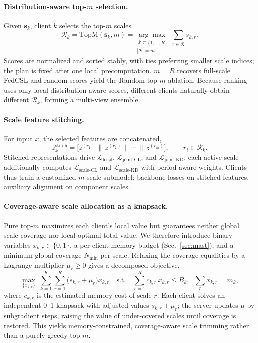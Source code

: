 \documentclass[sigconf]{acmart}
\begin{document}
\paragraph{Distribution-aware top-$m$ selection.}
Given $\mathbf{s}_k$, client $k$ selects the top-$m$ scales
\begin{equation}
\mathcal{R}_k=\mathrm{TopM}(\mathbf{s}_k,m)
=\underset{\substack{\mathcal{R}\subseteq\{1,\dots,R\}\\|\mathcal{R}|=m}}{\arg\max}\;
\sum_{r\in\mathcal{R}} s_{k,r}.
\label{eq:spilter-topm}
\end{equation}
Scores are normalized and sorted stably, with ties preferring smaller scale
indices; the plan is fixed after one local precomputation. $m=R$ recovers
full-scale FedCSL and random scores yield the Random-top-$m$ ablation. Because
ranking uses only local distribution-aware scores, different clients naturally
obtain different $\mathcal{R}_k$, forming a multi-view ensemble.

\paragraph{Scale feature stitching.}
For input $x$, the selected features are concatenated,
\begin{equation}
z^{\mathrm{stitch}}_k = \bigl[z^{(r_1)} \,\|\, z^{(r_2)} \,\|\, \cdots \,\|\, z^{(r_m)}\bigr],
\qquad r_i\in\mathcal{R}_k .
\label{eq:stitch}
\end{equation}
Stitched representations drive $\mathcal{L}_{\text{local}}$,
$\mathcal{L}_{\text{joint-CL}}$, and $\mathcal{L}_{\text{joint-KD}}$; each active
scale additionally computes $\mathcal{L}_{\text{scale-CL}}$ and
$\mathcal{L}_{\text{scale-KD}}$ with period-aware weights. Clients thus train a
customized $m$-scale submodel: backbone losses on stitched features, auxiliary
alignment on component scales.

\paragraph{Coverage-aware scale allocation as a knapsack.}
Pure top-$m$ maximizes each client's local value but guarantees neither global
scale coverage nor local optimal total value. We therefore introduce binary
variables $x_{k,r}\in\{0,1\}$, a per-client memory budget (Sec.~\ref{sec:mast}),
and a minimum global coverage $N_{\min}$ per scale. Relaxing the coverage
equalities by a Lagrange multiplier $\mu_r\ge 0$ gives a decomposed objective,
\begin{equation}
\max_{\{x_{k,r}\}}\;\sum_{k=1}^{K}\sum_{r=1}^{R}
\bigl(s_{k,r}+\mu_r\bigr)x_{k,r}
\quad\text{s.t.}\quad
\sum_{r=1}^{R} c_{k,r}\,x_{k,r}\le B_k,\;\;
\sum_{r}x_{k,r}=m_k ,
\label{eq:knapsack}
\end{equation}
where $c_{k,r}$ is the estimated memory cost of scale $r$. Each client solves an
independent 0--1 knapsack with adjusted values $s_{k,r}+\mu_r$; the server
updates $\mu$ by subgradient steps, raising the value of under-covered scales
until coverage is restored. This yields memory-constrained, coverage-aware scale
trimming rather than a purely greedy top-$m$.
\end{document}
